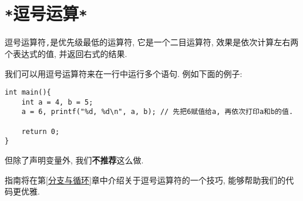     \section{\texttt{*}逗号运算\texttt{*}} \label{逗号运算}
        逗号运算符\texttt{,}是优先级最低的运算符, 它是一个二目运算符, 效果是依次计算左右两个表达式的值, 并返回右式的结果.

        我们可以用逗号运算符来在一行中运行多个语句. 例如下面的例子:
\begin{lstlisting}
int main(){
    int a = 4, b = 5;
    a = 6, printf("%d, %d\n", a, b); // 先把6赋值给a, 再依次打印a和b的值.

    return 0;
}
\end{lstlisting}
        
        但除了声明变量外, 我们\textbf{不推荐}这么做.

        指南将在第\ref{分支与循环}章中介绍关于逗号运算符的一个技巧, 能够帮助我们的代码更优雅.